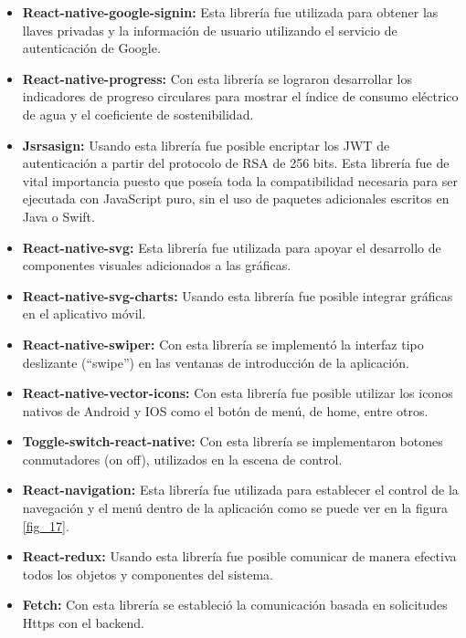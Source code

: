 \begin{itemize}
	\item \textbf{React-native-google-signin:} Esta librería fue utilizada para obtener las llaves privadas y la información de usuario utilizando el servicio de autenticación de Google.
	\item \textbf{React-native-progress:} Con esta librería se lograron desarrollar los indicadores de progreso circulares para mostrar el índice de consumo eléctrico de agua y el coeficiente de sostenibilidad.
	\item \textbf{Jsrsasign:} Usando esta librería fue posible encriptar los JWT de autenticación a partir del protocolo de RSA de 256 bits. Esta librería fue de vital importancia puesto que poseía toda la compatibilidad necesaria para ser ejecutada con JavaScript puro, sin el uso de paquetes adicionales escritos en Java o Swift.
	\item \textbf{React-native-svg:} Esta librería fue utilizada para apoyar el desarrollo de componentes visuales adicionados a las gráficas.
	\item \textbf{React-native-svg-charts:} Usando esta librería fue posible integrar gráficas en el aplicativo móvil.
	\item \textbf{React-native-swiper:} Con esta librería se implementó la interfaz tipo deslizante (``swipe'') en las ventanas de introducción de la aplicación.
	\item \textbf{React-native-vector-icons:} Con esta librería fue posible utilizar los iconos nativos de Android y IOS como el botón de menú, de home, entre otros.
	\item \textbf{Toggle-switch-react-native:} Con esta librería se implementaron botones conmutadores (on off), utilizados en la escena de control.
	\item \textbf{React-navigation:} Esta librería fue utilizada para establecer el control de la navegación y el menú dentro de la aplicación como se puede ver en la figura \ref{fig_17}.
	\item \textbf{React-redux:} Usando esta librería fue posible comunicar de manera efectiva todos los objetos y componentes del sistema.
	\item \textbf{Fetch:} Con esta librería se estableció la comunicación basada en solicitudes Https con el backend.
\end{itemize}

